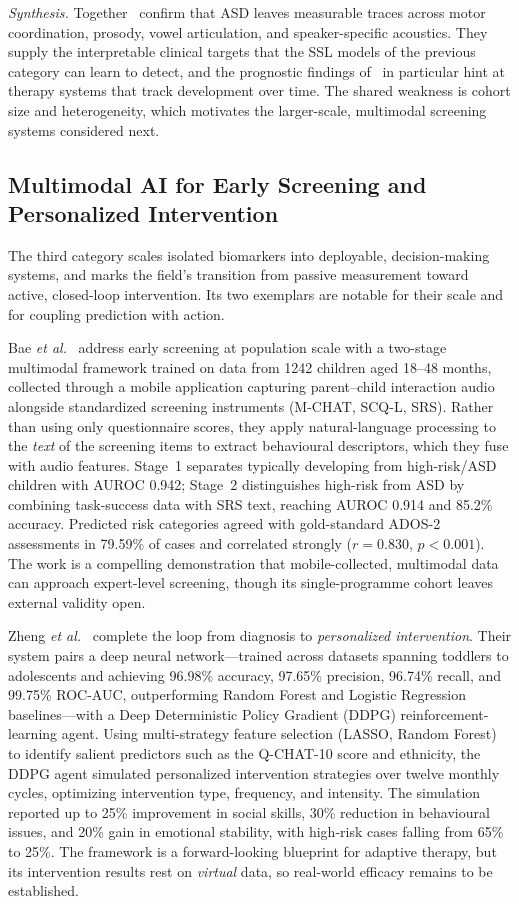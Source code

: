 \documentclass[conference]{IEEEtran}
\begin{document}
\emph{Synthesis.} Together~\cite{ref6,ref7,ref8,ref9} confirm that ASD leaves measurable traces across motor coordination, prosody, vowel articulation, and speaker-specific acoustics. They supply the interpretable clinical targets that the SSL models of the previous category can learn to detect, and the prognostic findings of~\cite{ref7} in particular hint at therapy systems that track development over time. The shared weakness is cohort size and heterogeneity, which motivates the larger-scale, multimodal screening systems considered next.

\subsection{Multimodal AI for Early Screening and Personalized Intervention}
The third category scales isolated biomarkers into deployable, decision-making systems, and marks the field's transition from passive measurement toward active, closed-loop intervention. Its two exemplars are notable for their scale and for coupling prediction with action.

Bae \textit{et al.}~\cite{ref10} address early screening at population scale with a two-stage multimodal framework trained on data from 1242 children aged 18--48 months, collected through a mobile application capturing parent--child interaction audio alongside standardized screening instruments (M-CHAT, SCQ-L, SRS). Rather than using only questionnaire scores, they apply natural-language processing to the \emph{text} of the screening items to extract behavioural descriptors, which they fuse with audio features. Stage~1 separates typically developing from high-risk/ASD children with AUROC 0.942; Stage~2 distinguishes high-risk from ASD by combining task-success data with SRS text, reaching AUROC 0.914 and 85.2\% accuracy. Predicted risk categories agreed with gold-standard ADOS-2 assessments in 79.59\% of cases and correlated strongly ($r=0.830$, $p<0.001$). The work is a compelling demonstration that mobile-collected, multimodal data can approach expert-level screening, though its single-programme cohort leaves external validity open.

Zheng \textit{et al.}~\cite{ref11} complete the loop from diagnosis to \emph{personalized intervention}. Their system pairs a deep neural network---trained across datasets spanning toddlers to adolescents and achieving 96.98\% accuracy, 97.65\% precision, 96.74\% recall, and 99.75\% ROC-AUC, outperforming Random Forest and Logistic Regression baselines---with a Deep Deterministic Policy Gradient (DDPG) reinforcement-learning agent. Using multi-strategy feature selection (LASSO, Random Forest) to identify salient predictors such as the Q-CHAT-10 score and ethnicity, the DDPG agent simulated personalized intervention strategies over twelve monthly cycles, optimizing intervention type, frequency, and intensity. The simulation reported up to 25\% improvement in social skills, 30\% reduction in behavioural issues, and 20\% gain in emotional stability, with high-risk cases falling from 65\% to 25\%. The framework is a forward-looking blueprint for adaptive therapy, but its intervention results rest on \emph{virtual} data, so real-world efficacy remains to be established.
\end{document}

